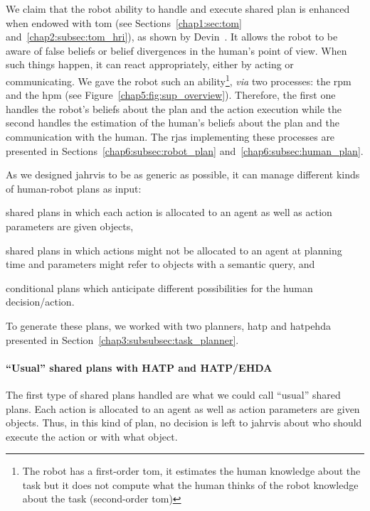 \documentclass[a4paper,11pt,twoside]{StyleThese}
\begin{document}
We claim that the robot ability to handle and execute shared plan is enhanced when endowed with \acrfull{tom} (see Sections~\ref{chap1:sec:tom} and~\ref{chap2:subsec:tom_hri}), as shown by Devin~\cite{devin_2016_implemented}. It allows the robot to be aware of false beliefs or belief divergences in the human's point of view. When such things happen, it can react appropriately, either by acting or communicating. We gave the robot such an ability\footnote{The robot has a first-order \acrshort{tom}, it estimates the human knowledge about the task but it does not compute what the human thinks of the robot knowledge about the task (second-order \acrshort{tom})}, \textit{via} two processes: the \acrfull{rpm} and the \acrfull{hpm} (see Figure~\ref{chap5:fig:sup_overview}). Therefore, the first one handles the robot's beliefs about the plan and the action execution while the second handles the estimation of the human's beliefs about the plan and the communication with the human. The \acrshort{rja}s implementing these processes are presented in Sections~\ref{chap6:subsec:robot_plan} and~\ref{chap6:subsec:human_plan}.

As we designed \acrshort{jahrvis} to be as generic as possible, it can manage different kinds of human-robot plans as input: 
\begin{bulletList}
	\item shared plans in which each action is allocated to an agent as well as action parameters are given objects,
	\item shared plans in which actions might not be allocated to an agent at planning time and parameters might refer to objects with a semantic query, and
	\item conditional plans which anticipate different possibilities for the human decision/action. 
\end{bulletList} 

To generate these plans, we worked with two planners, \acrshort{hatp} and \acrshort{hatpehda} presented in Section~\ref{chap3:subsubsec:task_planner}.

\paragraph{``Usual'' shared plans with HATP and HATP/EHDA} The first type of shared plans handled are what we could call ``usual'' shared plans. Each action is allocated to an agent as well as action parameters are given objects. Thus, in this kind of plan, no decision is left to \acrshort{jahrvis} about who should execute the action or with what object.
\end{document}
